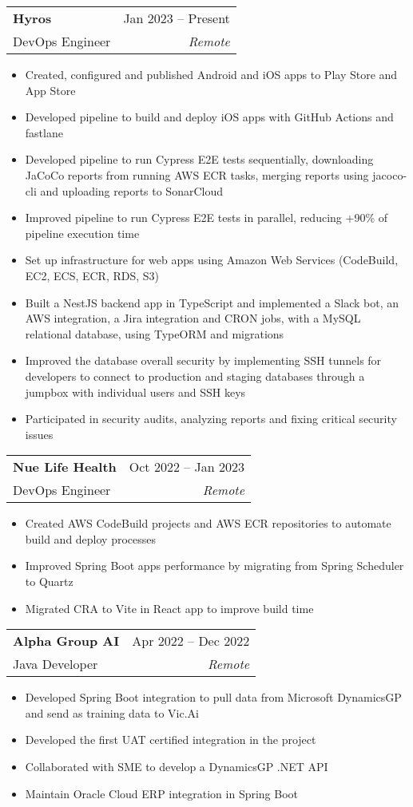 \documentclass[letterpaper,11pt]{article}
\makeatletter
\newcommand{\resumeItem}[1]{
  \item\small{
    {#1 \vspace{-2pt}}
  }
}
\newcommand{\resumeSubheading}[4]{
  \vspace{-2pt}\item
    \begin{tabular*}{0.97\textwidth}[t]{l@{\extracolsep{\fill}}r}
      \textbf{#1} & #2 \\
      {\small#3} & \textit{\small #4} \\
    \end{tabular*}\vspace{-7pt}
}
\newcommand{\resumeItemListStart}{\begin{itemize}}
\newcommand{\resumeItemListEnd}{\end{itemize}\vspace{-5pt}}
\makeatother
\begin{document}
    \resumeSubheading
      {Hyros}{Jan 2023 -- Present}
      {DevOps Engineer}{Remote}
      \resumeItemListStart
        \resumeItem{Created, configured and published Android and iOS apps to Play Store and App Store}
        \resumeItem{Developed pipeline to build and deploy iOS apps with GitHub Actions and fastlane}
        \resumeItem{Developed pipeline to run Cypress E2E tests sequentially, downloading JaCoCo reports from running AWS ECR tasks, merging reports using jacoco-cli and uploading reports to SonarCloud}
        \resumeItem{Improved pipeline to run Cypress E2E tests in parallel, reducing +90\% of pipeline execution time}
        \resumeItem{Set up infrastructure for web apps using Amazon Web Services (CodeBuild, EC2, ECS, ECR, RDS, S3)}
        \resumeItem{Built a NestJS backend app in TypeScript and implemented a Slack bot, an AWS integration, a Jira integration and CRON jobs, with a MySQL relational database, using TypeORM and migrations}
        \resumeItem{Improved the database overall security by implementing SSH tunnels for developers to connect to production and staging databases through a jumpbox with individual users and SSH keys}
        \resumeItem{Participated in security audits, analyzing reports and fixing critical security issues}
      \resumeItemListEnd

    \resumeSubheading
      {Nue Life Health}{Oct 2022 -- Jan 2023}
      {DevOps Engineer}{Remote}
      \resumeItemListStart
        \resumeItem{Created AWS CodeBuild projects and AWS ECR repositories to automate build and deploy processes}
        \resumeItem{Improved Spring Boot apps performance by migrating from Spring Scheduler to Quartz}
        \resumeItem{Migrated CRA to Vite in React app to improve build time}
    \resumeItemListEnd

    \resumeSubheading
      {Alpha Group AI}{Apr 2022 -- Dec 2022}
      {Java Developer}{Remote}
      \resumeItemListStart
        \resumeItem{Developed Spring Boot integration to pull data from Microsoft DynamicsGP and send as training data to Vic.Ai}
        \resumeItem{Developed the first UAT certified integration in the project}
        \resumeItem{Collaborated with SME to develop a DynamicsGP .NET API}
        \resumeItem{Maintain Oracle Cloud ERP integration in Spring Boot}
    \resumeItemListEnd
\end{document}
